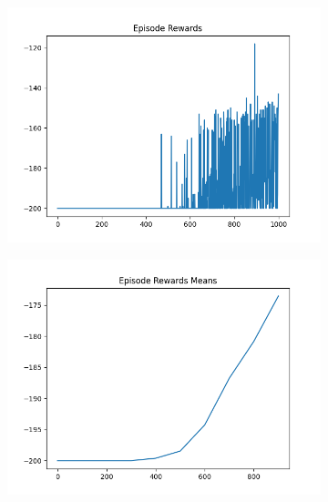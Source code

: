\begin{figure}[H]
\begin{subfigure}{.47\linewidth}
        \includegraphics[width=\textwidth]{mountain/2024-06-15_10-54-10_dqn_mountaincar_episode_rewards.png}
    \end{subfigure}
    \begin{subfigure}{.47\linewidth}
        \centering
        \includegraphics[width=\textwidth]{mountain/2024-06-15_10-54-10_dqn_mountaincar_episode_rewards_means.png}
    \end{subfigure}
\end{figure}
